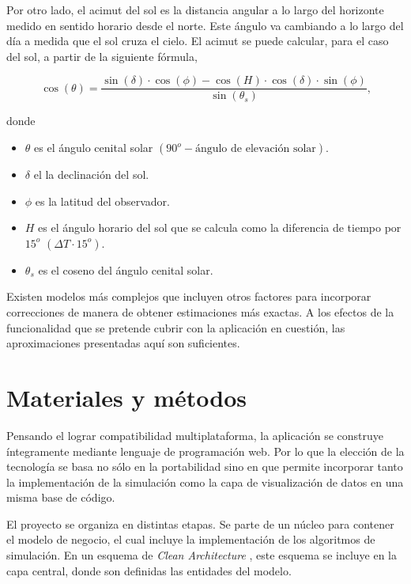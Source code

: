 \documentclass[a4paper]{article}
\begin{document}
Por otro lado, el acimut del sol es la distancia angular a lo largo del horizonte medido en sentido horario desde el norte. Este ángulo va cambiando a lo largo del día a medida que el sol cruza el cielo. El acimut se puede calcular, para el caso del sol, a partir de la siguiente fórmula,

\begin{equation}\label{eq:acimut}
    \cos\left(\theta\right) = \frac{\sin\left(\delta\right)\cdot \cos\left(\phi\right) - \cos\left(H\right)\cdot\cos\left(\delta\right)\cdot\sin\left(\phi\right)}{\sin\left(\theta_s\right)}\text{,}
\end{equation}

donde
\begin{itemize}
    \item $\theta$ es el ángulo cenital solar $\left(90^o - \text{ángulo de elevación solar} \right)$.
    \item $\delta$ el la declinación del sol.
    \item $\phi$ es la latitud del observador.
    \item $H$ es el ángulo horario del sol que se calcula como la diferencia de tiempo por $15^o$ $\left( \Delta T \cdot 15^o \right)$.
    \item $\theta_s$ es el coseno del ángulo cenital solar.
\end{itemize}

Existen modelos más complejos que incluyen otros factores para incorporar correcciones de manera de obtener estimaciones más exactas. A los efectos de la funcionalidad que se pretende cubrir con la aplicación en cuestión, las aproximaciones presentadas aquí son suficientes.

\section{Materiales y métodos}

Pensando el lograr compatibilidad multiplataforma, la aplicación se construye íntegramente mediante lenguaje de programación web. Por lo que la elección de la tecnología se basa no sólo en la portabilidad sino en que permite incorporar tanto la implementación de la simulación como la capa de visualización de datos en una misma base de código.

El proyecto se organiza en distintas etapas. Se parte de un núcleo para contener el modelo de negocio, el cual incluye la implementación de los algoritmos de simulación. En un esquema de \textit{Clean Architecture} \cite{cleanarch}, este esquema se incluye en la capa central, donde son definidas las entidades del modelo.
\end{document}
